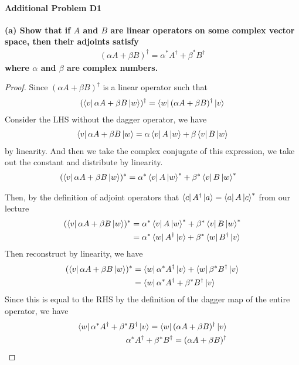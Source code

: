 \documentclass{article}
\begin{document}
\paragraph{Additional Problem D1}

\textbf{(a) Show that if $A$ and $B$ are linear operators on some complex vector space, then their adjoints satisfy} \begin{align*}
(\alpha A + \beta B)^\dagger =\alpha^* A^\dagger + \beta^* B^\dagger
\end{align*} \textbf{where $\alpha$ and $\beta$ are complex numbers.}

\begin{proof}
    Since $(\alpha A + \beta B)^\dagger$ is a linear operator such that 
    \begin{align}
        (\bra{v} \alpha A + \beta B \ket{w})^\dagger = \bra{w} (\alpha A + \beta B)^\dagger \ket{v}
    \end{align}
    Consider the LHS without the dagger operator, we have 
    \begin{align}
        \bra{v} \alpha A + \beta B \ket{w} = \alpha \bra{v} A \ket{w} + \beta \bra{v} B \ket{w}
    \end{align}
    by linearity. And then we take the complex conjugate of this expression, we take out the constant and distribute by linearity.
    \begin{align}
        (\bra{v} \alpha A + \beta B \ket{w})^* &= \alpha^* \bra{v} A \ket{w}^* +\beta^* \bra{v} B \ket{w}^*
    \end{align}

    Then, by the definition of adjoint operators that $\bra{c} A^\dagger \ket{a} = \bra{a} A \ket{c}^*$ from our lecture
    \begin{align}
        (\bra{v} \alpha A + \beta B \ket{w})^* &= \alpha^* \bra{v} A \ket{w}^* +\beta^* \bra{v} B \ket{w}^* \\
        &= \alpha^* \bra{w}A^\dagger \ket{v} + \beta^* \bra{w}B^\dagger\ket{v}
    \end{align}
    Then reconstruct by linearity, we have 
    \begin{align}
        (\bra{v} \alpha A + \beta B \ket{w})^*&= \bra{w}\alpha^* A^\dagger \ket{v} +  \bra{w}\beta^*B^\dagger\ket{v} \\
        &= \bra{w} \alpha^* A^\dagger + \beta^* B^\dagger \ket{v}
    \end{align}
    Since this is equal to the RHS by the definition of the dagger map of the entire operator, we have
    \begin{align}
        \bra{w} \alpha^* A^\dagger + \beta^* B^\dagger \ket{v} = \bra{w} (\alpha A + \beta B)^\dagger \ket{v} \\
        \alpha^* A^\dagger + \beta^* B^\dagger = (\alpha A + \beta B)^\dagger
    \end{align}
\end{proof}
\end{document}
